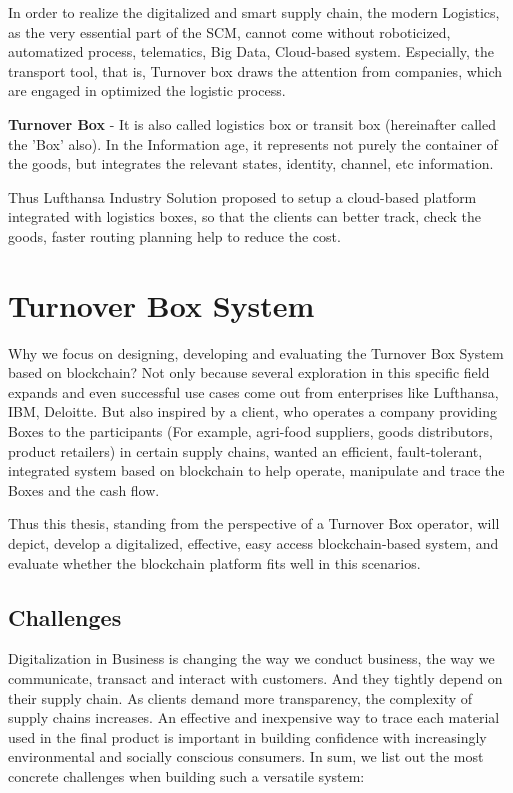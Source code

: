 In order to realize the digitalized and smart supply chain, the modern Logistics, as the very essential part of the SCM, cannot come without roboticized, automatized process, telematics, Big Data, Cloud-based system.  Especially, the transport tool, that is, Turnover box draws the attention from companies, which are engaged in optimized the logistic process.

\textbf{Turnover Box}
- It is also called logistics box or transit box (hereinafter called the 'Box' also). In the Information age, it represents not purely the container of the goods, but integrates the relevant states, identity, channel, etc information.  

Thus Lufthansa Industry Solution proposed to setup a cloud-based platform integrated with logistics boxes, so that the clients can better track, check the goods, faster routing planning help to reduce the cost.\cite{lufthansa}

\section{Turnover Box System}
Why we focus on designing, developing and evaluating the Turnover Box System based on blockchain? Not only because several exploration in this specific field expands and even successful use cases come out from enterprises like Lufthansa, IBM, Deloitte. But also inspired by a client, who operates a company providing Boxes to the participants (For example, agri-food suppliers, goods distributors, product retailers) in certain supply chains, wanted an efficient, fault-tolerant, integrated system based on blockchain to help operate, manipulate and trace the Boxes and the cash flow. 

Thus this thesis, standing from the perspective of a Turnover Box operator, will depict, develop a digitalized, effective, easy access blockchain-based system, and evaluate whether the blockchain platform fits well in this scenarios.

\subsection{Challenges}
Digitalization in Business is changing the way we conduct business, the way we communicate, transact and interact with customers. And they tightly depend on their supply chain. As clients demand more transparency, the complexity of supply chains increases. An effective and inexpensive way to trace each material used in the final product is important in building confidence with increasingly environmental and socially conscious consumers. 
In sum, we list out the most concrete challenges when building such a versatile system:


